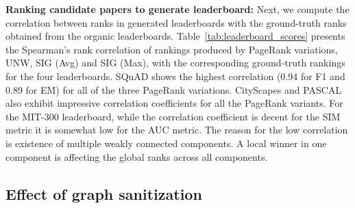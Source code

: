 \documentclass[runningheads]{llncs}
\begin{document}
\noindent \textbf{Ranking candidate papers to generate leaderboard:}
Next, we compute the correlation between ranks in generated leaderboards with the ground-truth ranks obtained from the organic leaderboards. Table~\ref{tab:leaderboard_scores} presents the Spearman's rank correlation of rankings produced by PageRank variations, UNW, SIG (Avg) and SIG (Max), with the corresponding ground-truth rankings for the four leaderboards.  SQuAD shows the highest correlation (0.94 for F1 and 0.89 for EM) for all of the three PageRank variations.  CityScapes and PASCAL also exhibit impressive correlation coefficients for all the PageRank variants. For the MIT-300 leaderboard, while the correlation coefficient is decent for the SIM metric it is somewhat low for the AUC metric. The reason for the low correlation is existence of multiple weakly connected components.  A local winner in one component is affecting the global ranks across all components. 

\begin{table}
\caption{Spearman's rank correlation of rankings produced by UNW, SIG (Avg) and SIG (Max) with the corresponding ground-truth rankings for the four leaderboards.}
\label{tab:leaderboard_scores}
\end{table}


\subsection{Effect of graph sanitization}
\end{document}
